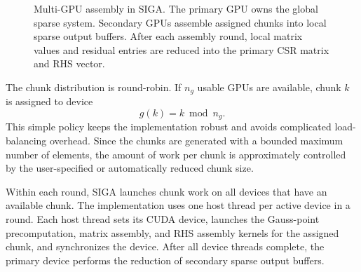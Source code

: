 \documentclass[11pt]{article}
\begin{document}
\begin{figure}[H]
{%
}
\caption{Multi-GPU assembly in SIGA. The primary GPU owns the global sparse system. Secondary GPUs assemble assigned chunks into local sparse output buffers. After each assembly round, local matrix values and residual entries are reduced into the primary CSR matrix and RHS vector.}
\label{fig:multigpu_assembly}
\end{figure}
\FloatBarrier

The chunk distribution is round-robin. If \(n_g\) usable GPUs are available, chunk \(k\) is assigned to device
\[
    g(k) = k \bmod n_g .
\]
This simple policy keeps the implementation robust and avoids complicated load-balancing overhead. Since the chunks are generated with a bounded maximum number of elements, the amount of work per chunk is approximately controlled by the user-specified or automatically reduced chunk size.

Within each round, SIGA launches chunk work on all devices that have an available chunk. The implementation uses one host thread per active device in a round. Each host thread sets its CUDA device, launches the Gauss-point precomputation, matrix assembly, and RHS assembly kernels for the assigned chunk, and synchronizes the device. After all device threads complete, the primary device performs the reduction of secondary sparse output buffers.
\end{document}
